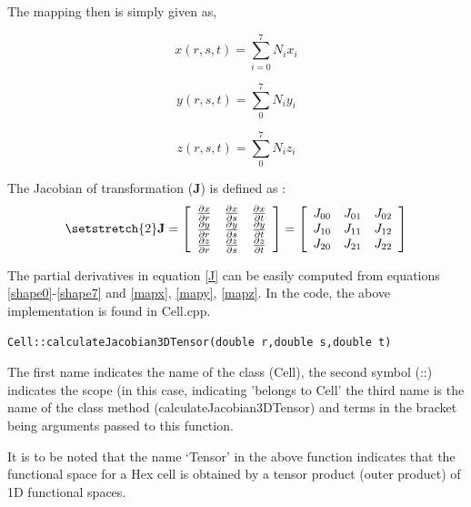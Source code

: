 The mapping then is simply given as,

\begin{equation}\label{mapx}
	x(r,s,t) = \sum_{i=0}^7 N_i x_i
\end{equation}

\begin{equation}\label{mapy}
	y(r,s,t) = \sum_0^7 N_i y_i
\end{equation}

\begin{equation}\label{mapz}
	z(r,s,t) = \sum_0^7 N_i z_i
\end{equation}

\begin{definition}\label{Jacobian}
	The Jacobian of transformation ($\mathbf{J}$) is defined as :
	\begin{equation}\label{J}
		{\setstretch{2}
		\mathbf{J} = \left[\begin{array}{c c c}
			\frac{\partial x}{\partial r} & \frac{\partial x}{\partial s} &  \frac{\partial x}{\partial t} \\
			\frac{\partial y}{\partial r} & \frac{\partial y}{\partial s} &  \frac{\partial y}{\partial t} \\
			\frac{\partial z}{\partial r} & \frac{\partial z}{\partial s} &  \frac{\partial z}{\partial t} \\
												                   \end{array} \right]
			= \left[\begin{array}{c c c}
				J_{00} & J_{01}  & J_{02}   \\
				J_{10} & J_{11}  & J_{12}   \\
				J_{20} & J_{21}  & J_{22}   \\
												                   \end{array} \right]
	        }
	\end{equation}
\end{definition}
The partial derivatives in equation \ref{J} can be easily computed from equations \ref{shape0}-\ref{shape7} and \ref{mapx}, \ref{mapy}, \ref{mapz}.
In the code, the above implementation is found in Cell.cpp.
\begin{verbatim} 
Cell::calculateJacobian3DTensor(double r,double s,double t) 
\end{verbatim}
\begin{note}
	The first name indicates the name of the class (Cell), the second symbol (::) indicates the scope (in this case, indicating
	'belongs to Cell' the third name is the name of the class method (calculateJacobian3DTensor) and terms in the bracket being
	arguments passed to this function.
\end{note}
It is to be noted that the name `Tensor' in the above function indicates that the functional space for a Hex cell is 
obtained by a tensor product (outer product) of 1D functional spaces.


